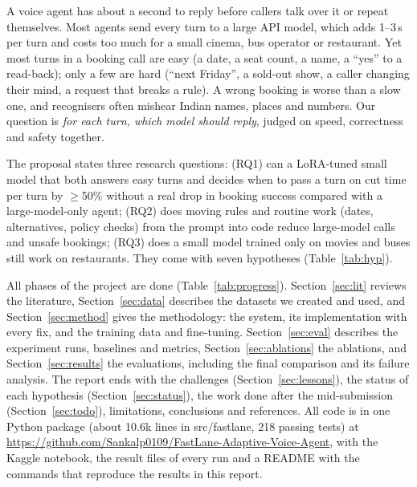 \documentclass[11pt,a4paper]{article}
\makeatletter
\renewcommand\paragraph{\@startsection{paragraph}{4}{\z@}{1.2ex plus 0.5ex minus 0.2ex}{-1em}{\normalsize\bfseries}}
\newcommand{\cmd}[1]{{\small\ttfamily\def\_{\textunderscore\allowbreak}#1}}  %
\makeatother
\begin{document}
A voice agent has about a second to reply before callers talk over it or repeat themselves. Most agents send every
turn to a large API model, which adds 1--3\,s per turn and costs too much for a small cinema, bus operator or
restaurant. Yet most turns in a booking call are easy (a date, a seat count, a name, a ``yes'' to a read-back); only
a few are hard (``next Friday'', a sold-out show, a caller changing their mind, a request that breaks a rule). A wrong
booking is worse than a slow one, and recognisers often mishear Indian names, places and numbers. Our question is
\emph{for each turn, which model should reply}, judged on speed, correctness and safety together.

The proposal states three research questions: (RQ1) can a LoRA-tuned small model that both answers easy turns and
decides when to pass a turn on cut time per turn by $\geq$50\% without a real drop in booking success compared with a
large-model-only agent; (RQ2) does moving rules and routine work (dates, alternatives, policy checks) from the prompt
into code reduce large-model calls and unsafe bookings; (RQ3) does a small model trained only on movies and buses
still work on restaurants. They come with seven hypotheses (Table~\ref{tab:hyp}).

\paragraph{Structure of this report.} All phases of the project are done (Table~\ref{tab:progress}).
Section~\ref{sec:lit} reviews the literature, Section~\ref{sec:data} describes the datasets we created and used, and
Section~\ref{sec:method} gives the methodology: the system, its implementation with every fix, and the training data
and fine-tuning. Section~\ref{sec:eval} describes the experiment runs, baselines and metrics,
Section~\ref{sec:ablations} the ablations, and Section~\ref{sec:results} the evaluations, including the final
comparison and its failure analysis. The report ends with the challenges (Section~\ref{sec:lessons}), the status of
each hypothesis (Section~\ref{sec:status}), the work done after the mid-submission (Section~\ref{sec:todo}),
limitations, conclusions and references. All code is in one Python package (about 10.6k lines in
\cmd{src/fastlane}, 218 passing tests) at \url{https://github.com/Sankalp0109/FastLane-Adaptive-Voice-Agent}, with the Kaggle notebook, the result files of every run
and a README with the commands that reproduce the results in this report.
\end{document}
